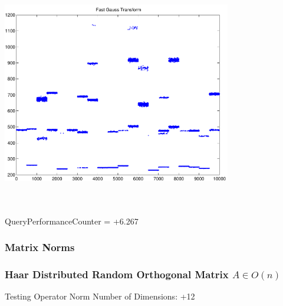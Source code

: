 \documentclass[9pt]{article}
\theoremstyle{plain}
\theoremstyle{definition}
\theoremstyle{remark}
\numberwithin{equation}{section}
\begin{document}
\includegraphics[width=10.0cm,height=10.0cm]{FGT20_Centers.pdf}

QueryPerformanceCounter  =  +6.267
\subsubsection{Matrix Norms}
\subsubsection{Haar Distributed Random Orthogonal Matrix $A \in O(n)$}
 Testing Operator Norm
Number of Dimensions: +12
\end{document}

